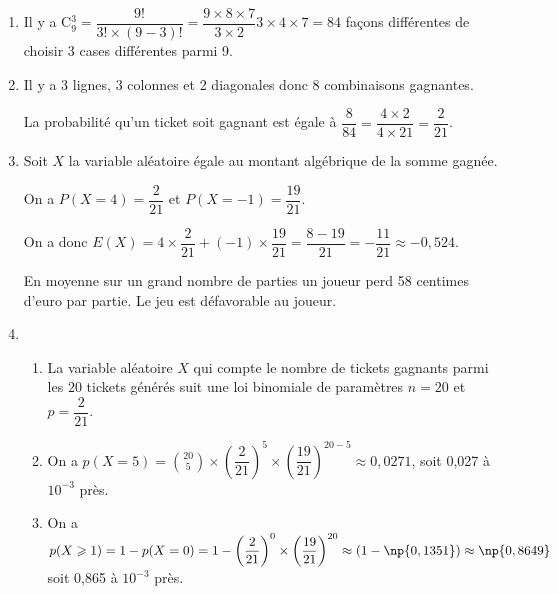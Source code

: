 \begin{enumerate}
\item %
Il y a C$_9^3 = \dfrac{9!}{3! \times (9 - 3)!} = \dfrac{9 \times 8 \times 7}{3 \times 2}3 \times 4 \times 7 = 84$ façons différentes de choisir 3 cases différentes parmi 9.
\item %
Il y a 3 lignes, 3 colonnes et 2 diagonales donc 8 combinaisons gagnantes.

La probabilité qu'un ticket soit gagnant est égale à $\dfrac{8}{84} = \dfrac{4\times 2}{4 \times 21} = \dfrac{2}{21}$.
\item %
Soit $X$ la variable aléatoire égale au montant algébrique de la somme gagnée.

On a $P(X  = 4) = \dfrac{2}{21}$ et $P(X = - 1) = \dfrac{19}{21}$.

On a donc $E(X) = 4 \times \dfrac{2}{21} + (- 1) \times \dfrac{19}{21} = \dfrac{8 - 19}{21} = - \dfrac{11}{21} \approx - 0,524$.

En moyenne sur un grand nombre de parties un joueur perd 58 centimes d'euro par partie. Le jeu est défavorable au joueur.
\item %
	\begin{enumerate}
		\item %
La variable aléatoire $X$ qui compte le nombre de tickets gagnants parmi les $20$ tickets générés suit une loi binomiale de paramètres $n = 20$ et $p = \dfrac{2}{21}$.
		\item %
On a $p(X = 5) = \binom{20}{5}\times \left(\dfrac{2}{21}\right)^5\times \left(\dfrac{19}{21}\right)^{20-5} \approx 0,0271$, soit 0,027 à $10^{-3}$ près.
		\item %
On a $p(X \geqslant 1) = 1 - p(X = 0) = 1 - \left(\dfrac{2}{21}\right)^{0}\times \left(\dfrac{19}{21}\right)^{20}  \approx (1 - \np{0,1351}) \approx \np{0,8649}$ soit 0,865 à $10^{-3}$ près.
	\end{enumerate}
\end{enumerate}

\bigskip

